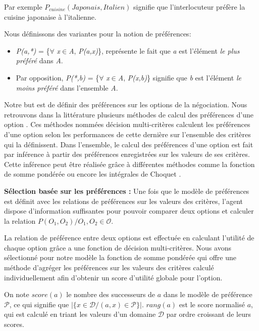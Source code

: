 \documentclass[a4paper,french]{article}
\begin{document}
Par exemple $P_{cuisine} (Japonais, Italien)$ signifie que l'interlocuteur préfère la cuisine japonaise à l'italienne. 

\par Nous définissons des variantes pour la notion de préférences:
\begin{itemize}
	\item  \emph{P(a,*)}  = \{$\forall$ \emph{x}$\in$\emph{A}, \emph{P(a,x)}\}, représente le fait que  \emph{a} est l'élément  \textit{le plus préféré} dans \emph{A}.
	\item Par opposition, \emph{P(*,b)} = \{$\forall$ \emph{x}$\in$\emph{A}, \emph{P(x,b)}\} signifie que \emph{b} est l'élément \textit{le moins préféré} dans l'ensemble \emph{A}. 
\end{itemize}


\par Notre but est de définir des préférences sur les options de la négociation.  Nous retrouvons dans la littérature plusieurs méthodes de calcul des préférences d'une option \cite{dodgson2009multi}. Ces méthodes nommées décision multi-critères calculent les préférences d'une option selon les performances de cette dernière sur l'ensemble des critères qui la définissent. Dans l'ensemble\cite{dodgson2009multi}, le calcul des préférences d'une option est fait par inférence à partir des préférences enregistrées sur les valeurs de ses critères. Cette inférence peut être réalisée grâce à différentes méthodes comme la fonction de somme pondérée \cite{yager2012ordered} ou encore les intégrales de Choquet \cite{chouquet1953}. \\

\par  \textbf{Sélection basée sur les préférences :} Une fois que le modèle de préférences est définit avec les relations de préférences sur les valeurs des critères, l'agent dispose d'information suffisantes pour pouvoir comparer deux options et calculer la relation 
$P(O_1, O_2) / O_1, O_2 \in \mathcal{O} $.

La relation de préférence entre deux options est effectuée en calculant l'utilité de chaque option grâce a une fonction de décision multi-critères. 
Nous avons sélectionné pour notre modèle la fonction de somme pondérée \cite{yager2012ordered} qui offre une méthode d'agréger les préférences sur les valeurs des critères calculé individuellement afin d'obtenir un score d'utilité globale pour l'option.
 
\par On note  $score(a)$ le nombre des successeurs de  $a$  dans le modèle de préférence $\mathcal{P}$, ce qui signifie que $|\{x \in \mathcal{D} / (a,x) \in \mathcal{P}\}|$. 
$rang(a)$ est le score normalisé $a$, qui est calculé en triant les valeurs d'un domaine $\mathcal{D}$ par ordre croissant de leurs scores. 
\end{document}
